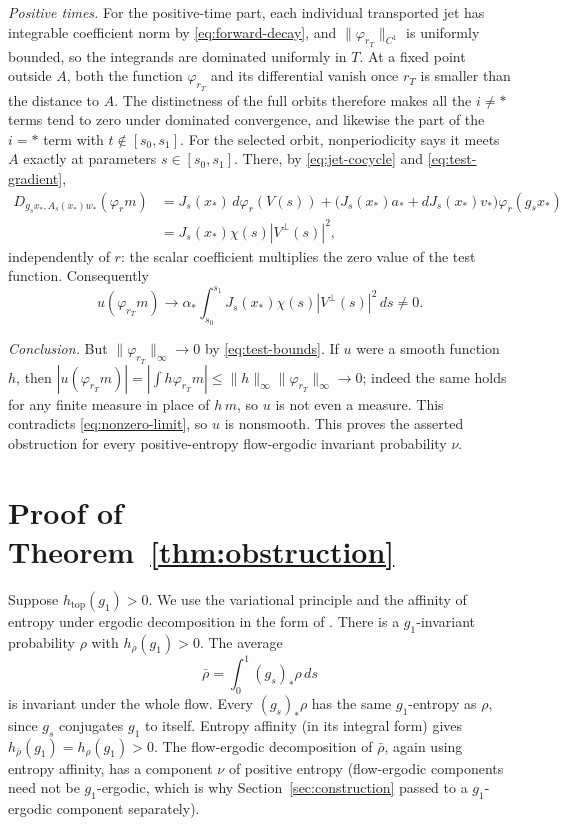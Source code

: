 \documentclass[12pt]{article}
\theoremstyle{remark}
\newcommand{\htop}{h_{\mathrm{top}}}
\begin{document}
\emph{Positive times.}
For the positive-time part, each individual transported jet has
integrable coefficient norm by \eqref{eq:forward-decay}, and
\(\|\varphi_{r_T}\|_{C^1}\) is uniformly bounded, so the integrands
are dominated uniformly in \(T\).
At a fixed point outside \(A\), both the function \(\varphi_{r_T}\)
and its differential vanish once \(r_T\) is smaller than the distance
to \(A\).
The distinctness of the full orbits therefore makes all the
\(i\ne *\) terms tend to zero under dominated convergence, and
likewise the part of the \(i=*\) term with \(t\notin[s_0,s_1]\).
For the selected orbit, nonperiodicity says it meets \(A\)
exactly at parameters \(s\in[s_0,s_1]\).
There, by \eqref{eq:jet-cocycle} and \eqref{eq:test-gradient},
\[
\begin{aligned}
 D_{g_sx_*,A_s(x_*)w_*}(\varphi_{r}m)
 &=J_s(x_*)\,d\varphi_r(V(s))
  +\bigl(J_s(x_*)a_*+dJ_s(x_*)v_*\bigr)\varphi_r(g_sx_*)\\
 &=J_s(x_*)\chi(s)|V^\perp(s)|^2,
\end{aligned}
\]
independently of \(r\): the scalar coefficient multiplies the zero
value of the test function.  Consequently
\begin{equation}\label{eq:nonzero-limit}
 u(\varphi_{r_T}m)\longrightarrow
 \alpha_*\int_{s_0}^{s_1}
        J_s(x_*)\chi(s)|V^\perp(s)|^2\,ds\ne0 .
\end{equation}

\emph{Conclusion.}
But \(\|\varphi_{r_T}\|_\infty\to0\) by \eqref{eq:test-bounds}.
If \(u\) were a smooth function \(h\), then
\(|u(\varphi_{r_T}m)|=|\int h\varphi_{r_T}m|
\le\|h\|_\infty\|\varphi_{r_T}\|_\infty\to0\); indeed the same
holds for any finite measure in place of \(h\,m\), so \(u\) is not
even a measure.  This contradicts \eqref{eq:nonzero-limit}, so
\(u\) is nonsmooth.
This proves the asserted obstruction for every positive-entropy
flow-ergodic invariant probability \(\nu\).

\section{Proof of Theorem~\ref{thm:obstruction}}
\label{sec:conclusion}

Suppose \(\htop(g_1)>0\).  We use the variational principle and the
affinity of entropy under ergodic decomposition in the form of
\cite[Chapter~8]{Walters1982}.
There is a \(g_1\)-invariant probability
\(\rho\) with \(h_\rho(g_1)>0\).
The average
\[
 \bar\rho=\int_0^1(g_s)_*\rho\,ds
\]
is invariant under the whole flow.
Every \((g_s)_*\rho\) has the same \(g_1\)-entropy as \(\rho\),
since \(g_s\) conjugates \(g_1\) to itself.
Entropy affinity (in its integral form) gives
\(h_{\bar\rho}(g_1)=h_\rho(g_1)>0\).
The flow-ergodic decomposition of \(\bar\rho\), again using entropy
affinity, has a component \(\nu\) of positive entropy (flow-ergodic
components need not be \(g_1\)-ergodic, which is why
Section~\ref{sec:construction} passed to a \(g_1\)-ergodic component
separately).
\end{document}
